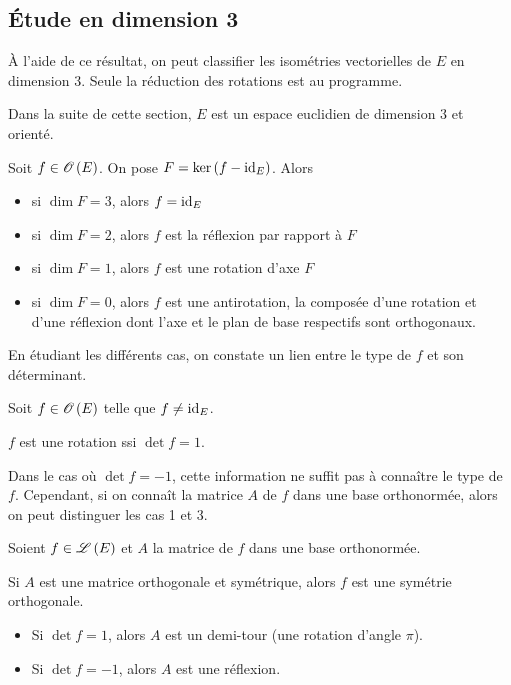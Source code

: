 \subsection{Étude en dimension 3}

À l'aide de ce résultat, on peut classifier les isométries vectorielles de \(E\) en dimension \(3\). Seule la réduction des rotations est au programme.

Dans la suite de cette section, \(E\) est un espace euclidien de dimension \(3\) et orienté.

\begin{prop}
Soit \(f\in\Orth{}[E]\). On pose \(F=\ker\left(f-\mathrm{id}_{E}\right)\). Alors

\begin{itemize}
    \item si \(\dim F=3\), alors \(f=\mathrm{id}_{E}\) \\
    \item si \(\dim F=2\), alors \(f\) est la réflexion par rapport à \(F\) \\
    \item si \(\dim F=1\), alors \(f\) est une rotation d'axe \(F\) \\
    \item si \(\dim F=0\), alors \(f\) est une antirotation, \cad la composée d'une rotation et d'une réflexion dont l'axe et le plan de base respectifs sont orthogonaux.
\end{itemize}
\end{prop}

En étudiant les différents cas, on constate un lien entre le type de \(f\) et son déterminant.

\begin{prop}
Soit \(f\in\Orth{}[E]\) telle que \(f\not=\mathrm{id}_{E}\).

\(f\) est une rotation ssi \(\det f=1\).
\end{prop}

Dans le cas où \(\det f=-1\), cette information ne suffit pas à connaître le type de \(f\). Cependant, si on connaît la matrice \(A\) de \(f\) dans une base orthonormée, alors on peut distinguer les cas 1 et 3.

\begin{prop}
Soient \(f\in\mathscr{L}\left(E\right)\) et \(A\) la matrice de \(f\) dans une base orthonormée.

Si \(A\) est une matrice orthogonale et symétrique, alors \(f\) est une symétrie orthogonale.

\begin{itemize}
    \item Si \(\det f=1\), alors \(A\) est un demi-tour (une rotation d'angle \(\pi\)). \\
    \item Si \(\det f=-1\), alors \(A\) est une réflexion.
\end{itemize}
\end{prop}

